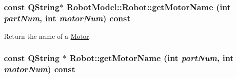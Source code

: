 \label{class_robot_model_1_1_robot_a41d959b8a9f469ee1caa5e3881a9445f}
\hypertarget{class_robot_model_1_1_robot_a13f6c53297cdc08f2ccf8e2c41a6efd3}{
\subsubsection[{getMotorName}]{\setlength{\rightskip}{0pt plus 5cm}const QString$\ast$ RobotModel::Robot::getMotorName (int {\em partNum}, \/  int {\em motorNum}) const}}
\label{class_robot_model_1_1_robot_a13f6c53297cdc08f2ccf8e2c41a6efd3}


Return the name of a \hyperlink{class_robot_model_1_1_motor}{Motor}. \hypertarget{class_robot_model_1_1_robot_a18b266083c6b87d05d1dc3479409e287}{
\subsubsection[{getMotorName}]{\setlength{\rightskip}{0pt plus 5cm}const QString $\ast$ Robot::getMotorName (int {\em partNum}, \/  int {\em motorNum}) const}}
\label{class_robot_model_1_1_robot_a18b266083c6b87d05d1dc3479409e287}


